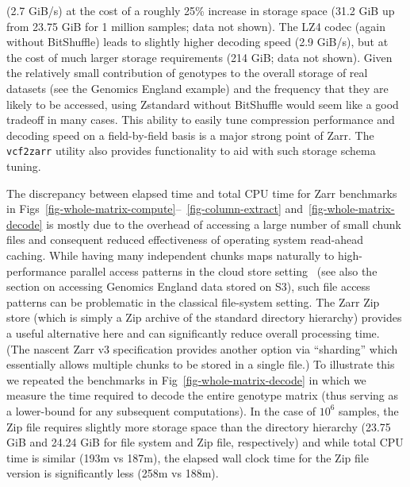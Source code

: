 \documentclass[a4paper,num-refs]{oup-contemporary}
\begin{document}
(2.7 GiB/s) at the cost of a roughly 25\% increase in storage
space (31.2 GiB up from 23.75 GiB for 1 million samples; data not
shown). The LZ4 codec (again without BitShuffle) leads to slightly higher
decoding speed (2.9 GiB/s), but at the cost of much larger storage requirements
(214 GiB; data not shown).
Given the relatively small contribution of genotypes to the
overall storage of real datasets (see the Genomics England example)
and the frequency that they are likely to be accessed, using
Zstandard without BitShuffle
would seem like a good tradeoff in many cases.
This ability to easily tune compression performance
and decoding speed on a field-by-field basis is a major strong
point of Zarr. The \texttt{vcf2zarr} utility also provides
functionality to aid with such storage schema tuning.

The discrepancy between elapsed time and total CPU time for Zarr
benchmarks in
Figs~\ref{fig-whole-matrix-compute}--~\ref{fig-column-extract}
and~\ref{fig-whole-matrix-decode} is mostly due to the overhead
of accessing a large number of small chunk files and
consequent reduced effectiveness of operating system read-ahead caching.
While having many independent chunks maps
naturally to high-performance parallel access patterns
in the cloud store setting~\citep{durner2023exploiting}
(see also the section on accessing Genomics England data stored on S3),
such file access patterns can be problematic in the
classical file-system setting.
The Zarr Zip store (which is simply a Zip archive of the standard directory
hierarchy) provides a useful alternative here and can
significantly reduce overall processing time. 
(The nascent Zarr v3 specification provides another option 
via  ``sharding'' which essentially 
allows multiple chunks to be stored in a single file.)
To illustrate this
we repeated the benchmarks in Fig~\ref{fig-whole-matrix-decode} in
which we measure the time required to decode the entire genotype
matrix (thus serving as a lower-bound for any subsequent computations).
In the case of $10^6$ samples, the Zip file requires slightly more
storage space than the directory hierarchy (23.75 GiB and 24.24 GiB
for file system and Zip file, respectively)
and while total
CPU time is similar (193m vs 187m), the elapsed wall clock
time for the Zip file version is significantly less
(258m vs 188m).
\end{document}
